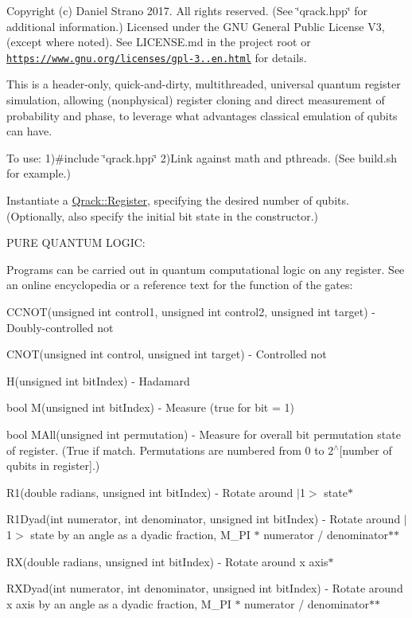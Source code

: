 Copyright (c) Daniel Strano 2017. All rights reserved. (See \char`\"{}qrack.\+hpp\char`\"{} for additional information.) Licensed under the G\+NU General Public License V3, (except where noted). See L\+I\+C\+E\+N\+S\+E.\+md in the project root or \href{https://www.gnu.org/licenses/gpl-3.0.en.html}{\tt https\+://www.\+gnu.\+org/licenses/gpl-\/3..\+en.\+html} for details.

This is a header-\/only, quick-\/and-\/dirty, multithreaded, universal quantum register simulation, allowing (nonphysical) register cloning and direct measurement of probability and phase, to leverage what advantages classical emulation of qubits can have.

To use\+: 1)\#include \char`\"{}qrack.\+hpp\char`\"{} 2)Link against math and pthreads. (See build.\+sh for example.)

Instantiate a \hyperlink{classQrack_1_1Register}{Qrack\+::\+Register}, specifying the desired number of qubits. (Optionally, also specify the initial bit state in the constructor.)

P\+U\+RE Q\+U\+A\+N\+T\+UM L\+O\+G\+IC\+:

Programs can be carried out in quantum computational logic on any register. See an online encyclopedia or a reference text for the function of the gates\+:

C\+C\+N\+O\+T(unsigned int control1, unsigned int control2, unsigned int target) -\/ Doubly-\/controlled not

C\+N\+O\+T(unsigned int control, unsigned int target) -\/ Controlled not

H(unsigned int bit\+Index) -\/ Hadamard

bool M(unsigned int bit\+Index) -\/ Measure (true for bit = 1)

bool M\+All(unsigned int permutation) -\/ Measure for overall bit permutation state of register. (True if match. Permutations are numbered from 0 to 2$^\wedge$\mbox{[}number of qubits in register\mbox{]}.)

R1(double radians, unsigned int bit\+Index) -\/ Rotate around $\vert$1$>$ state$\ast$

R1\+Dyad(int numerator, int denominator, unsigned int bit\+Index) -\/ Rotate around $\vert$1$>$ state by an angle as a dyadic fraction, M\+\_\+\+PI $\ast$ numerator / denominator$\ast$$\ast$

R\+X(double radians, unsigned int bit\+Index) -\/ Rotate around x axis$\ast$

R\+X\+Dyad(int numerator, int denominator, unsigned int bit\+Index) -\/ Rotate around x axis by an angle as a dyadic fraction, M\+\_\+\+PI $\ast$ numerator / denominator$\ast$$\ast$

